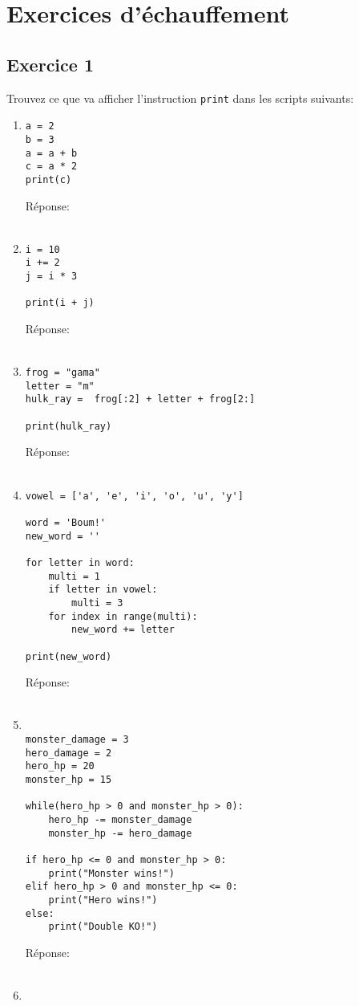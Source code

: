\documentclass[12pt,a4paper]{article}
\newcommand{\codeintext}[1]{\texttt{#1}}
\newcommand{\response}[0]{Réponse:\hrulefill\\\\}
\begin{document}
\section*{Exercices d'échauffement}

\subsection*{Exercice 1}

Trouvez ce que va afficher l'instruction \codeintext{print} dans les scripts suivants:

\begin{enumerate}

\item
\begin{lstlisting}
a = 2
b = 3
a = a + b
c = a * 2
print(c)
\end{lstlisting}
\response %

\item
\begin{lstlisting}
i = 10
i += 2
j = i * 3

print(i + j)
\end{lstlisting}
\response %

\item
\begin{lstlisting}
frog = "gama"
letter = "m"
hulk_ray =  frog[:2] + letter + frog[2:]

print(hulk_ray)
\end{lstlisting}
\response

\pagebreak
\item
\begin{lstlisting}
vowel = ['a', 'e', 'i', 'o', 'u', 'y']

word = 'Boum!'
new_word = ''

for letter in word:
	multi = 1
	if letter in vowel:
		multi = 3
	for index in range(multi):
		new_word += letter

print(new_word)
\end{lstlisting}
\response %

\item
\begin{lstlisting}

monster_damage = 3
hero_damage = 2
hero_hp = 20
monster_hp = 15

while(hero_hp > 0 and monster_hp > 0):
	hero_hp -= monster_damage
	monster_hp -= hero_damage

if hero_hp <= 0 and monster_hp > 0:
	print("Monster wins!")
elif hero_hp > 0 and monster_hp <= 0:
	print("Hero wins!")
else:
	print("Double KO!")
\end{lstlisting}
\response %
\pagebreak
\item
\begin{lstlisting}


\end{lstlisting}
\end{enumerate}
\end{document}
